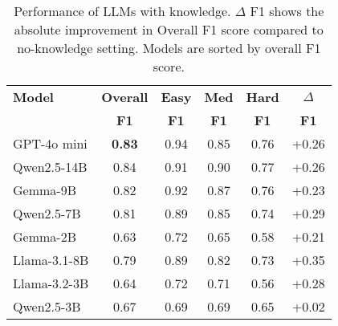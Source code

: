 \begin{table}[h]
\footnotesize  %
\centering
\setlength{\tabcolsep}{4pt}  %
\begin{tabular}{l|c|ccc|c}
\hline
\textbf{Model} & \textbf{Overall} & \textbf{Easy} & \textbf{Med} & \textbf{Hard} & $\Delta$ \\
& \textbf{F1} & \textbf{F1} & \textbf{F1} & \textbf{F1} & \textbf{F1} \\
\hline
GPT-4o mini & \textbf{0.83} & 0.94 & 0.85 & 0.76 & +0.26 \\
Qwen2.5-14B & 0.84 & 0.91 & 0.90 & 0.77 & +0.26 \\
Gemma-9B & 0.82 & 0.92 & 0.87 & 0.76 & +0.23 \\
Qwen2.5-7B & 0.81 & 0.89 & 0.85 & 0.74 & +0.29 \\
Gemma-2B & 0.63 & 0.72 & 0.65 & 0.58 & +0.21 \\
Llama-3.1-8B & 0.79 & 0.89 & 0.82 & 0.73 & +0.35 \\
Llama-3.2-3B & 0.64 & 0.72 & 0.71 & 0.56 & +0.28 \\
Qwen2.5-3B & 0.67 & 0.69 & 0.69 & 0.65 & +0.02 \\
\hline
\end{tabular}
\caption{Performance of LLMs with knowledge. $\Delta$ F1 shows the absolute improvement in Overall F1 score compared to no-knowledge setting. Models are sorted by overall F1 score.}
\label{tab:llm_performance_with_2}
\end{table}

